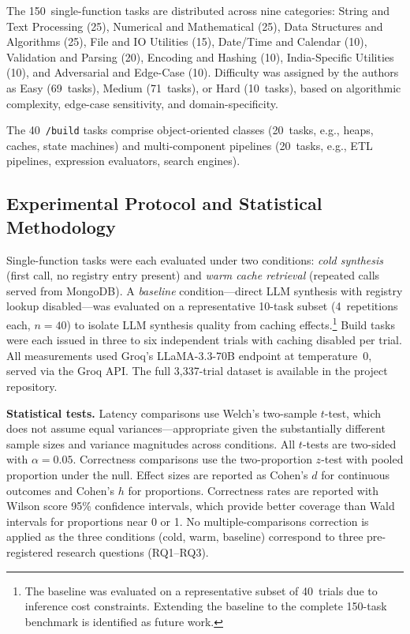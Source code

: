 \documentclass[conference]{IEEEtran}
\begin{document}
The 150~single-function tasks are distributed across nine categories:
String and Text Processing (25), Numerical and Mathematical (25),
Data Structures and Algorithms (25), File and IO Utilities (15),
Date/Time and Calendar (10), Validation and Parsing (20),
Encoding and Hashing (10), India-Specific Utilities (10), and
Adversarial and Edge-Case (10).
Difficulty was assigned by the authors as Easy (69~tasks),
Medium (71~tasks), or Hard (10~tasks), based on algorithmic complexity,
edge-case sensitivity, and domain-specificity.

The 40~\texttt{/build} tasks comprise object-oriented classes (20~tasks,
e.g., heaps, caches, state machines) and multi-component pipelines
(20~tasks, e.g., ETL pipelines, expression evaluators, search engines).

\subsection{Experimental Protocol and Statistical Methodology}
\label{subsec:protocol}

Single-function tasks were each evaluated under two conditions:
\emph{cold synthesis} (first call, no registry entry present) and
\emph{warm cache retrieval} (repeated calls served from MongoDB).
A \emph{baseline} condition---direct LLM synthesis with registry lookup
disabled---was evaluated on a representative 10-task subset
(4~repetitions each, $n = 40$) to isolate LLM synthesis quality from
caching effects.\footnote{The baseline was evaluated on a representative
subset of 40~trials due to inference cost constraints. Extending the
baseline to the complete 150-task benchmark is identified as future work.}
Build tasks were each issued in three to six independent trials with
caching disabled per trial.
All measurements used Groq's LLaMA-3.3-70B endpoint at temperature~0,
served via the Groq API.
The full 3{,}337-trial dataset is available in the project repository.

\textbf{Statistical tests.}
Latency comparisons use Welch's two-sample $t$-test, which does not
assume equal variances---appropriate given the substantially different
sample sizes and variance magnitudes across conditions.
All $t$-tests are two-sided with $\alpha = 0.05$.
Correctness comparisons use the two-proportion $z$-test with pooled
proportion under the null.
Effect sizes are reported as Cohen's $d$ for continuous outcomes and
Cohen's $h$ for proportions.
Correctness rates are reported with Wilson score 95\% confidence
intervals, which provide better coverage than Wald intervals for
proportions near 0 or 1.
No multiple-comparisons correction is applied as the three conditions
(cold, warm, baseline) correspond to three pre-registered research
questions (RQ1--RQ3).
\end{document}
